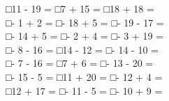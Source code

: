 \documentclass[uplatex,
paper=a4,
fontsize=18pt,
jafontsize=16pt,
number_of_lines=30,
line_length=30zh,
baselineskip=25pt,
]{jlreq}
\begin{document}
□\hspace{1em}11 - 19 =\hspace{2em} □\hspace{1em}7 + 15 =\hspace{2em} □\hspace{1em}18 + 18 =\hspace{2em} 
\\

□\hspace{1em}- 1 + 2 =\hspace{2em} □\hspace{1em}- 18 + 5 =\hspace{2em} □\hspace{1em}- 19 - 17 =\hspace{2em} 
\\

□\hspace{1em}- 14 + 5 =\hspace{2em} □\hspace{1em}- 2 + 4 =\hspace{2em} □\hspace{1em}- 3 + 19 =\hspace{2em} 
\\

□\hspace{1em}- 8 - 16 =\hspace{2em} □\hspace{1em}14 - 12 =\hspace{2em} □\hspace{1em}- 14 - 10 =\hspace{2em} 
\\

□\hspace{1em}- 7 - 16 =\hspace{2em} □\hspace{1em}7 + 6 =\hspace{2em} □\hspace{1em}- 13 - 20 =\hspace{2em} 
\\

□\hspace{1em}- 15 - 5 =\hspace{2em} □\hspace{1em}11 + 20 =\hspace{2em} □\hspace{1em}- 12 + 4 =\hspace{2em} 
\\

□\hspace{1em}12 + 17 =\hspace{2em} □\hspace{1em}- 11 - 5 =\hspace{2em} □\hspace{1em}- 10 + 9 =\hspace{2em} 
\\
\end{document}
